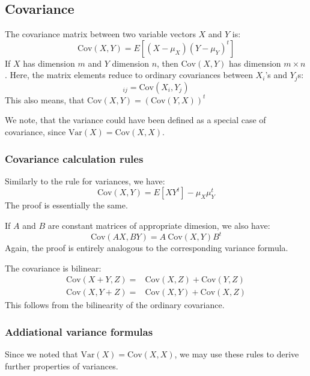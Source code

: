 \documentclass[12pt, a4paper]{article}
\numberwithin{equation}{section}
\begin{document}
\subsection{Covariance}
The covariance matrix between two variable vectors $X$ and $Y$ is:
\begin{equation}
\textrm{Cov}(X,Y)=E[(X-\mu_X)(Y-\mu_Y)^t]
\end{equation}
If $X$ has dimension $m$ and $Y$ dimension $n$, then $\textrm{Cov}(X,Y)$ has dimension $m\times n$. Here, the matrix elements reduce to ordinary covariances between $X_i$'s and $Y_j$s:
\begin{equation}
[\textrm{Cov}(X,Y)]_{ij}=\textrm{Cov}(X_i,Y_j)
\end{equation}
This also means, that $\textrm{Cov}(X,Y)=\left(\textrm{Cov}(Y,X)\right)^t$

We note, that the variance could have been defined as a special case of covariance, since $\textrm{Var}(X)=\textrm{Cov}(X,X)$.

\subsubsection{Covariance calculation rules}
Similarly to the rule for variances, we have:
\begin{equation}
\textrm{Cov}(X,Y)=E[XY^t]-\mu_X\mu_Y^t
\end{equation}
The proof is essentially the same.

If $A$ and $B$ are constant matrices of appropriate dimesion, we also have:
\begin{equation}
\textrm{Cov}(AX,BY)=A\ \textrm{Cov}(X,Y)B^t
\end{equation}
Again, the proof is entirely analogous to the corresponding variance formula.

The covariance is bilinear:
\begin{align}
\textrm{Cov}(X+Y,Z)=&\textrm{Cov}(X,Z)+\textrm{Cov}(Y,Z)\\
\textrm{Cov}(X,Y+Z)=&\textrm{Cov}(X,Y)+\textrm{Cov}(X,Z)
\end{align}
This follows from the bilinearity of the ordinary covariance.

\subsubsection{Addiational variance formulas}
Since we noted that $\textrm{Var}(X)=\textrm{Cov}(X,X)$, we may use these rules to derive further properties of variances.
\end{document}
